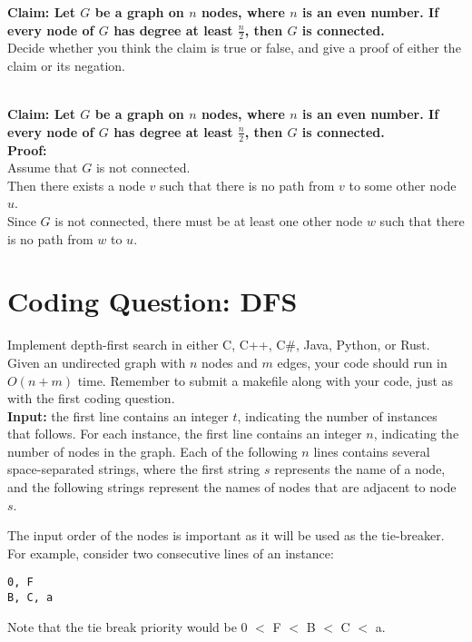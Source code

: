 \documentclass[solutionorbox,answers]{exam}
\begin{document}
\begin{questions}
\textbf{Claim: Let $G$ be a graph on $n$ nodes, where $n$ is an even number. If every node of $G$ has degree at least $\frac{n}{2}$, then $G$ is connected.} \\

Decide whether you think the claim is true or false, and give a proof of either the claim or its negation. 

\begin{solutionbox}{4.5in} \vspace{1em}    \\
  \textbf{Claim: Let $G$ be a graph on $n$ nodes, where $n$ is an even number. If every node of $G$ has degree at least $\frac{n}{2}$, then $G$ is connected.} \\
  \textbf{Proof:} \\
  Assume that $G$ is not connected. \\
  Then there exists a node $v$ such that there is no path from $v$ to some other node $u$. \\
  Since $G$ is not connected, there must be at least one other node $w$ such that there is no path from $w$ to $u$. \\
  
  \end{solutionbox}

\pagebreak



\section*{Coding Question: DFS}
\question
Implement depth-first search in either C, C++, C\#, Java, Python, or Rust. Given an undirected graph with $n$ nodes and $m$ edges, your code should run in $O(n + m)$ time. Remember to submit a makefile along with your code, just as with the first coding question.\\

\textbf{Input:} the first line contains an integer $t$, indicating the number of instances that follows. For each instance, the first line contains an integer $n$, indicating the number of nodes in the graph. Each of the following $n$ lines contains several space-separated strings, where the first string $s$ represents the name of a node, and the following strings represent the names of nodes that are adjacent to node $s$.

The input order of the nodes is important as it will be used as the tie-breaker. For example, consider two consecutive lines of an instance:
\begin{verbatim}
0, F
B, C, a
\end{verbatim}
Note that the tie break priority would be 0 $<$ F $<$ B $<$ C $<$ a.\\


\end{questions}
\end{document}
